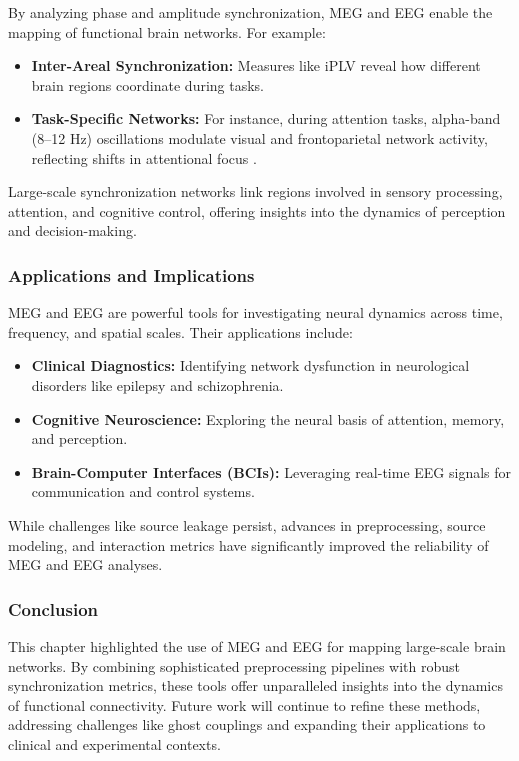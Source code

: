 By analyzing phase and amplitude synchronization, MEG and EEG enable the mapping of functional brain networks. For example:
\begin{itemize}
    \item \textbf{Inter-Areal Synchronization:} Measures like iPLV reveal how different brain regions coordinate during tasks.
    \item \textbf{Task-Specific Networks:} For instance, during attention tasks, alpha-band (8–12 Hz) oscillations modulate visual and frontoparietal network activity, reflecting shifts in attentional focus \cite{lobier2017functional}.
\end{itemize}

Large-scale synchronization networks link regions involved in sensory processing, attention, and cognitive control, offering insights into the dynamics of perception and decision-making.

\subsubsection*{Applications and Implications}

MEG and EEG are powerful tools for investigating neural dynamics across time, frequency, and spatial scales. Their applications include:
\begin{itemize}
    \item \textbf{Clinical Diagnostics:} Identifying network dysfunction in neurological disorders like epilepsy and schizophrenia.
    \item \textbf{Cognitive Neuroscience:} Exploring the neural basis of attention, memory, and perception.
    \item \textbf{Brain-Computer Interfaces (BCIs):} Leveraging real-time EEG signals for communication and control systems.
\end{itemize}

While challenges like source leakage persist, advances in preprocessing, source modeling, and interaction metrics have significantly improved the reliability of MEG and EEG analyses.

\subsubsection*{Conclusion}

This chapter highlighted the use of MEG and EEG for mapping large-scale brain networks. By combining sophisticated preprocessing pipelines with robust synchronization metrics, these tools offer unparalleled insights into the dynamics of functional connectivity. Future work will continue to refine these methods, addressing challenges like ghost couplings and expanding their applications to clinical and experimental contexts.
